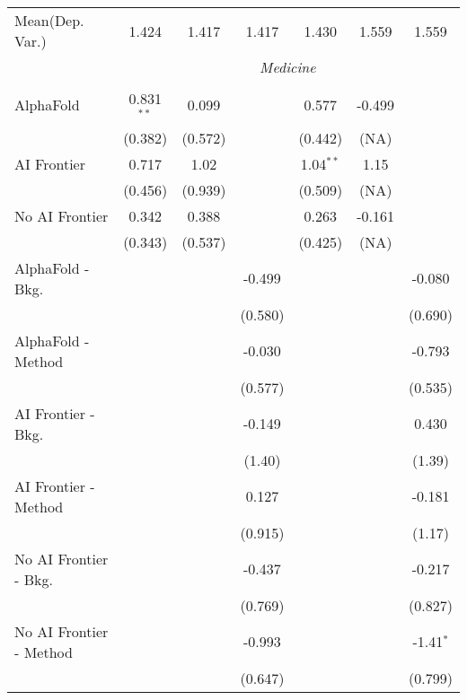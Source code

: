 \begin{tabular}{lcccccc}
Mean(Dep. Var.) & 1.424 & 1.417 & 1.417 & 1.430 & 1.559 & 1.559 \\
 & \multicolumn{6}{c}{\textit{Medicine}} \\ \\
   AlphaFold               & 0.831$^{**}$ & 0.099   &         & 0.577       & -0.499 &   \\   
                           & (0.382)      & (0.572) &         & (0.442)     & (NA)   &   \\   
   AI Frontier             & 0.717        & 1.02    &         & 1.04$^{**}$ & 1.15   &   \\   
                           & (0.456)      & (0.939) &         & (0.509)     & (NA)   &   \\   
   No AI Frontier          & 0.342        & 0.388   &         & 0.263       & -0.161 &   \\   
                           & (0.343)      & (0.537) &         & (0.425)     & (NA)   &   \\   
   AlphaFold - Bkg.        &              &         & -0.499  &             &        & -0.080\\   
                           &              &         & (0.580) &             &        & (0.690)\\   
   AlphaFold - Method      &              &         & -0.030  &             &        & -0.793\\   
                           &              &         & (0.577) &             &        & (0.535)\\   
   AI Frontier - Bkg.      &              &         & -0.149  &             &        & 0.430\\   
                           &              &         & (1.40)  &             &        & (1.39)\\   
   AI Frontier - Method    &              &         & 0.127   &             &        & -0.181\\   
                           &              &         & (0.915) &             &        & (1.17)\\   
   No AI Frontier - Bkg.   &              &         & -0.437  &             &        & -0.217\\   
                           &              &         & (0.769) &             &        & (0.827)\\   
   No AI Frontier - Method &              &         & -0.993  &             &        & -1.41$^{*}$\\   
                           &              &         & (0.647) &             &        & (0.799)\\   

\end{tabular}

